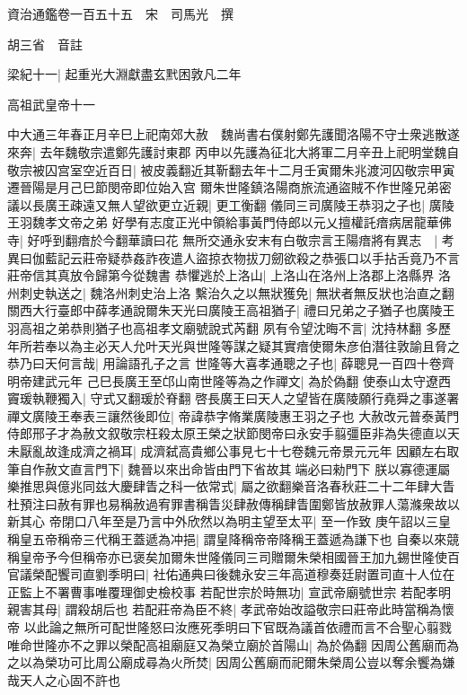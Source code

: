 資治通鑑卷一百五十五　宋　司馬光　撰

胡三省　音註

梁紀十一|{
	起重光大淵獻盡玄黓困敦凡二年}


高祖武皇帝十一

中大通三年春正月辛巳上祀南郊大赦　魏尚書右僕射鄭先護聞洛陽不守士衆逃散遂來奔|{
	去年魏敬宗遣鄭先護討東郡}
丙申以先護為征北大將軍二月辛丑上祀明堂魏自敬宗被囚宫室空近百日|{
	被皮義翻近其靳翻去年十二月壬寅爾朱兆渡河囚敬宗甲寅遷晉陽是月己巳節閔帝即位始入宫}
爾朱世隆鎮洛陽商旅流通盜賊不作世隆兄弟密議以長廣王疎遠又無人望欲更立近親|{
	更工衡翻}
儀同三司廣陵王恭羽之子也|{
	廣陵王羽魏孝文帝之弟}
好學有志度正光中領給事黃門侍郎以元乂擅權託瘖病居龍華佛寺|{
	好呼到翻瘖於今翻華讀曰花}
無所交通永安末有白敬宗言王陽瘖將有異志　|{
	考異曰伽藍記云莊帝疑恭姦詐夜遣人盜掠衣物拔刀劒欲殺之恭張口以手拈舌竟乃不言莊帝信其真放令歸第今從魏書}
恭懼逃於上洛山|{
	上洛山在洛州上洛郡上洛縣界}
洛州刺史執送之|{
	魏洛州刺史治上洛}
繫治久之以無狀獲免|{
	無狀者無反狀也治直之翻}
關西大行臺郎中薛孝通說爾朱天光曰廣陵王高祖猶子|{
	禮曰兄弟之子猶子也廣陵王羽高祖之弟恭則猶子也高祖孝文廟號說式芮翻}
夙有令望沈晦不言|{
	沈持林翻}
多歷年所若奉以為主必天人允叶天光與世隆等謀之疑其實瘖使爾朱彦伯潛往敦諭且脅之恭乃曰天何言哉|{
	用論語孔子之言}
世隆等大喜孝通聰之子也|{
	薛聰見一百四十卷齊明帝建武元年}
己巳長廣王至邙山南世隆等為之作禪文|{
	為於偽翻}
使泰山太守遼西竇瑗執鞭獨入|{
	守式又翻瑗於脊翻}
啓長廣王曰天人之望皆在廣陵願行堯舜之事遂署禪文廣陵王奉表三讓然後即位|{
	帝諱恭字脩業廣陵惠王羽之子也}
大赦改元普泰黃門侍郎邢子才為赦文叙敬宗枉殺太原王榮之狀節閔帝曰永安手翦彊臣非為失德直以天未厭亂故逢成濟之禍耳|{
	成濟弑高貴鄉公事見七十七卷魏元帝景元元年}
因顧左右取筆自作赦文直言門下|{
	魏晉以來出命皆由門下省故其端必曰勑門下}
朕以寡德運屬樂推思與億兆同兹大慶肆眚之科一依常式|{
	屬之欲翻樂音洛春秋莊二十二年肆大眚杜預注曰赦有罪也易稱赦過宥罪書稱眚災肆赦傳稱肆眚圍鄭皆放赦罪人蕩滌衆故以新其心}
帝閉口八年至是乃言中外欣然以為明主望至太平|{
	至一作致}
庚午詔以三皇稱皇五帝稱帝三代稱王蓋遞為冲挹|{
	謂皇降稱帝帝降稱王蓋遞為謙下也}
自秦以來競稱皇帝予今但稱帝亦已褒矣加爾朱世隆儀同三司贈爾朱榮相國晉王加九錫世隆使百官議榮配饗司直劉季明曰|{
	社佑通典曰後魏永安三年高道穆奏廷尉置司直十人位在正監上不署曹事唯覆理御史檢校事}
若配世宗於時無功|{
	宣武帝廟號世宗}
若配孝明親害其母|{
	謂殺胡后也}
若配莊帝為臣不終|{
	孝武帝始改謚敬宗曰莊帝此時當稱為懷帝}
以此論之無所可配世隆怒曰汝應死季明曰下官既為議首依禮而言不合聖心翦戮唯命世隆亦不之罪以榮配高祖廟庭又為榮立廟於首陽山|{
	為於偽翻}
因周公舊廟而為之以為榮功可比周公廟成尋為火所焚|{
	因周公舊廟而祀爾朱榮周公豈以奪余饗為嫌哉天人之心固不許也}
